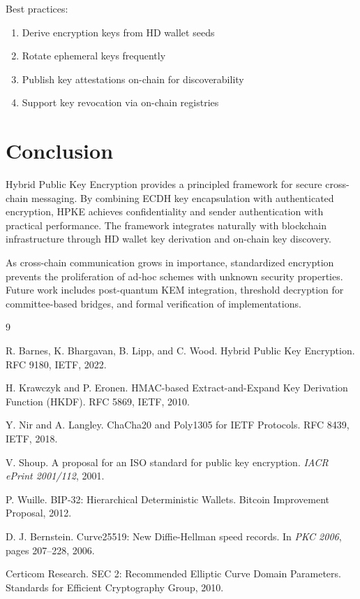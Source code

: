\documentclass[11pt,a4paper]{article}
\begin{document}
Best practices:
\begin{enumerate}
    \item Derive encryption keys from HD wallet seeds
    \item Rotate ephemeral keys frequently
    \item Publish key attestations on-chain for discoverability
    \item Support key revocation via on-chain registries
\end{enumerate}

\section{Conclusion}

Hybrid Public Key Encryption provides a principled framework for secure cross-chain messaging. By combining ECDH key encapsulation with authenticated encryption, HPKE achieves confidentiality and sender authentication with practical performance. The framework integrates naturally with blockchain infrastructure through HD wallet key derivation and on-chain key discovery.

As cross-chain communication grows in importance, standardized encryption prevents the proliferation of ad-hoc schemes with unknown security properties. Future work includes post-quantum KEM integration, threshold decryption for committee-based bridges, and formal verification of implementations.


\begin{thebibliography}{9}

R. Barnes, K. Bhargavan, B. Lipp, and C. Wood.
\newblock Hybrid Public Key Encryption.
\newblock RFC 9180, IETF, 2022.

H. Krawczyk and P. Eronen.
\newblock HMAC-based Extract-and-Expand Key Derivation Function (HKDF).
\newblock RFC 5869, IETF, 2010.

Y. Nir and A. Langley.
\newblock ChaCha20 and Poly1305 for IETF Protocols.
\newblock RFC 8439, IETF, 2018.

V. Shoup.
\newblock A proposal for an ISO standard for public key encryption.
\newblock \textit{IACR ePrint 2001/112}, 2001.

P. Wuille.
\newblock BIP-32: Hierarchical Deterministic Wallets.
\newblock Bitcoin Improvement Proposal, 2012.

D. J. Bernstein.
\newblock Curve25519: New Diffie-Hellman speed records.
\newblock In \textit{PKC 2006}, pages 207--228, 2006.

Certicom Research.
\newblock SEC 2: Recommended Elliptic Curve Domain Parameters.
\newblock Standards for Efficient Cryptography Group, 2010.

\end{thebibliography}
\end{document}
